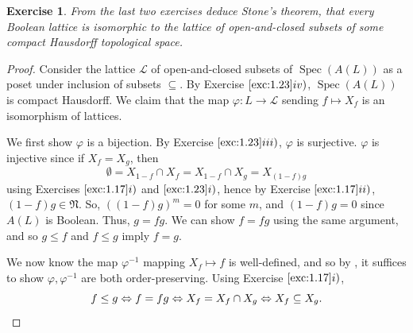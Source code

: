\documentclass[12pt,letterpaper]{article}
\newtheorem{problem}{Exercise}[section]
\theoremstyle{definition}
\theoremstyle{remark}
\numberwithin{figure}{problem}
\numberwithin{equation}{section}
\DeclareMathOperator{\Spec}{Spec}
\newcommand{\LL}{\mathscr{L}}
\begin{document}
\begin{problem}
  From the last two exercises deduce Stone's theorem, that every Boolean lattice is isomorphic to the lattice of open-and-closed subsets of some compact Hausdorff topological space.
\end{problem}
\begin{proof}
  Consider the lattice
  $\LL$ of open-and-closed subsets of
  $\Spec
  (A(L))$ as a poset under inclusion of subsets
  $\subseteq$.
  By Exercise
  $\ref{exc:1.23}iv)$,
  $\Spec(A(L))$ is compact Hausdorff.
  We claim that the map
  $\varphi\colon L \to
  \LL$ sending
  $f \mapsto
  X_f$ is an isomorphism of lattices.
  \par We first show
  $\varphi$ is a bijection.
  By Exercise
  $\ref{exc:1.23}iii)$,
  $\varphi$ is surjective.
  $\varphi$ is injective since if
  $X_f =
  X_g$, then
  \begin{equation*}
    \emptyset = X_{1-f} \cap X_f = X_{1-f} \cap X_g = X_{(1-f)g}
  \end{equation*}
  using Exercises
  $\ref{exc:1.17}i)$ and
  $\ref{exc:1.23}i)$, hence by Exercise
  $\ref{exc:1.17}ii)$,
  $(1-f)g \in
  \mathfrak{N}$.
  So,
  $\left((1-f)g\right)^m =
  0$ for some
  $m$, and
  $(1-f)g =
  0$ since
  $A(L)$ is Boolean.
  Thus,
  $g =
  fg$.
  We can show
  $f =
  fg$ using the same argument, and so
  $g \le
  f$ and
  $f \le
  g$ imply
  $f =
  g$.
  \par We now know the map
  $\varphi^{-1}$ mapping
  $X_f \mapsto
  f$ is well-defined, and so by \cite[Thm.~2.3]{BS81}, it suffices to show
  $\varphi,\varphi^{-1}$ are both order-preserving.
  Using Exercise
  $\ref{exc:1.17}i)$,
  \begin{equation*}
    f \le g \Leftrightarrow f = fg \Leftrightarrow X_f = X_f \cap X_g \Leftrightarrow X_f \subseteq X_g.\qedhere
  \end{equation*}
\end{proof}
\end{document}
